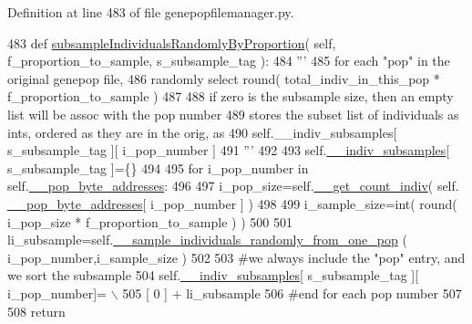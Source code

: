 Definition at line 483 of file genepopfilemanager.\+py.


\begin{DoxyCode}
483     \textcolor{keyword}{def }\hyperlink{classnegui_1_1genepopfilemanager_1_1GenepopFileManager_a5c85ac4838fd6919be1c408bcd39f54e}{subsampleIndividualsRandomlyByProportion}( self, 
      f\_proportion\_to\_sample, s\_subsample\_tag ):
484         \textcolor{stringliteral}{'''}
485 \textcolor{stringliteral}{        for each "pop" in the original genepop file,}
486 \textcolor{stringliteral}{        randomly select round( total\_indiv\_in\_this\_pop * f\_proportion\_to\_sample )}
487 \textcolor{stringliteral}{        }
488 \textcolor{stringliteral}{        if zero is the subsample size, then an empty list will be assoc with the pop number}
489 \textcolor{stringliteral}{        stores the subset list of individuals as ints, ordered as they are in the orig, as      }
490 \textcolor{stringliteral}{        self.\_\_indiv\_subsamples[ s\_subsample\_tag ][ i\_pop\_number ]}
491 \textcolor{stringliteral}{        '''}
492 
493         self.\hyperlink{classnegui_1_1genepopfilemanager_1_1GenepopFileManager_a1e8379bcee4902ca9314ff53fcb71644}{\_\_indiv\_subsamples}[ s\_subsample\_tag ]=\{\}
494 
495         \textcolor{keywordflow}{for} i\_pop\_number \textcolor{keywordflow}{in} self.\hyperlink{classnegui_1_1genepopfilemanager_1_1GenepopFileManager_ae24c2bdd19136a345bdb42fd49c5d91f}{\_\_pop\_byte\_addresses}:
496 
497             i\_pop\_size=self.\hyperlink{classnegui_1_1genepopfilemanager_1_1GenepopFileManager_a378ff9f54898427a5d2c3cb8ab1b2d78}{\_\_get\_count\_indiv}( self.
      \hyperlink{classnegui_1_1genepopfilemanager_1_1GenepopFileManager_ae24c2bdd19136a345bdb42fd49c5d91f}{\_\_pop\_byte\_addresses}[ i\_pop\_number ] )
498 
499             i\_sample\_size=int( round( i\_pop\_size * f\_proportion\_to\_sample ) )
500 
501             li\_subsample=self.\hyperlink{classnegui_1_1genepopfilemanager_1_1GenepopFileManager_ae5a84fa307ba7bbefebe80ac7416c4cd}{\_\_sample\_individuals\_randomly\_from\_one\_pop}
      ( i\_pop\_number,i\_sample\_size )
502 
503             \textcolor{comment}{#we always include the "pop" entry, and we sort the subsample}
504             self.\hyperlink{classnegui_1_1genepopfilemanager_1_1GenepopFileManager_a1e8379bcee4902ca9314ff53fcb71644}{\_\_indiv\_subsamples}[ s\_subsample\_tag ][ i\_pop\_number]= \(\backslash\)
505                      [ 0 ] +  li\_subsample
506         \textcolor{comment}{#end for each pop number}
507 
508         \textcolor{keywordflow}{return}
\end{DoxyCode}
